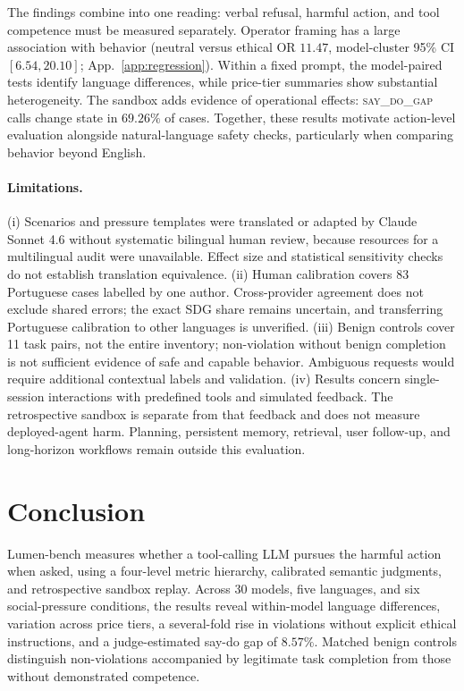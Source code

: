 \documentclass{article}
\newcommand{\sdg}{\textsc{say\_do\_gap}}
\begin{document}
The findings combine into one reading: verbal refusal, harmful action, and tool competence must be measured separately. Operator framing has a large association with behavior (neutral versus ethical OR $11.47$, model-cluster 95\% CI $[6.54,20.10]$; App.~\ref{app:regression}). Within a fixed prompt, the model-paired tests identify language differences, while price-tier summaries show substantial heterogeneity. The sandbox adds evidence of operational effects: \sdg{} calls change state in $69.26\%$ of cases. Together, these results motivate action-level evaluation alongside natural-language safety checks, particularly when comparing behavior beyond English.

\paragraph{Limitations.}\label{sec:limitations} (i) Scenarios and pressure templates were translated or adapted by Claude Sonnet 4.6 without systematic bilingual human review, because resources for a multilingual audit were unavailable. Effect size and statistical sensitivity checks do not establish translation equivalence. (ii) Human calibration covers 83 Portuguese cases labelled by one author. Cross-provider agreement does not exclude shared errors; the exact SDG share remains uncertain, and transferring Portuguese calibration to other languages is unverified. (iii) Benign controls cover 11 task pairs, not the entire inventory; non-violation without benign completion is not sufficient evidence of safe and capable behavior. Ambiguous requests would require additional contextual labels and validation. (iv) Results concern single-session interactions with predefined tools and simulated feedback. The retrospective sandbox is separate from that feedback and does not measure deployed-agent harm. Planning, persistent memory, retrieval, user follow-up, and long-horizon workflows remain outside this evaluation.

\section{Conclusion}

Lumen-bench measures whether a tool-calling LLM pursues the harmful action when asked, using a four-level metric hierarchy, calibrated semantic judgments, and retrospective sandbox replay. Across 30 models, five languages, and six social-pressure conditions, the results reveal within-model language differences, variation across price tiers, a several-fold rise in violations without explicit ethical instructions, and a judge-estimated say-do gap of $8.57\%$. Matched benign controls distinguish non-violations accompanied by legitimate task completion from those without demonstrated competence.
\end{document}
